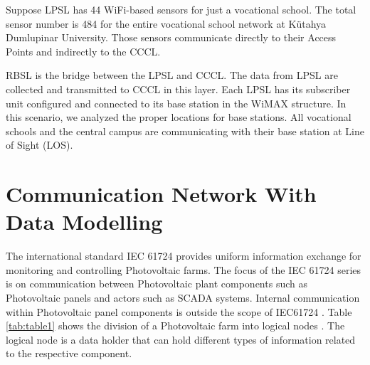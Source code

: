 \documentclass[conference, letterpaper]{IEEEtran}
\begin{document}
Suppose LPSL has 44 WiFi-based sensors for just a vocational school. The total sensor number is 484 for the entire vocational school network at Kütahya Dumlupinar University. Those sensors communicate directly to their Access Points and indirectly to the CCCL.


RBSL is the bridge between the LPSL and CCCL. The data from LPSL are collected and transmitted to CCCL in this layer. Each LPSL has its subscriber unit configured and connected to its base station in the WiMAX structure. In this scenario, we analyzed the proper locations for base stations. All vocational schools and the central campus are communicating with their base station at Line of Sight (LOS).

\section{Communication Network With Data Modelling}
The international standard IEC 61724 provides uniform information exchange for monitoring and controlling Photovoltaic farms. The focus of the IEC 61724 series is on communication between Photovoltaic plant components such as Photovoltaic panels and actors such as SCADA systems. Internal communication within Photovoltaic panel components is outside the scope of IEC61724 \cite{b7}\cite{b8}. Table \ref{tab:table1} shows the division of a Photovoltaic farm into logical nodes \cite{b7}. The logical node is a data holder that can hold different types of information related to the respective component.
\end{document}
